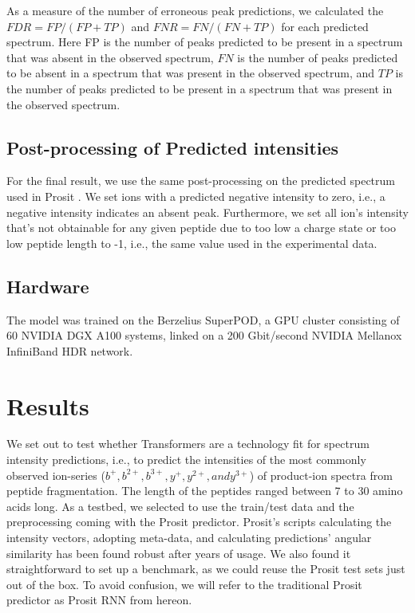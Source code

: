 \documentclass[10pt,a4paper]{article}
\begin{document}
As a measure of the number of erroneous peak predictions, we calculated the $FDR=FP/(FP+TP)$ and $FNR=FN/(FN+TP)$ for each predicted spectrum. Here FP is the number of peaks predicted to be present in a spectrum that was absent in the observed spectrum, $FN$ is the number of peaks predicted to be absent in a spectrum that was present in the observed spectrum, and $TP$ is the number of peaks predicted to be present in a spectrum that was present in the observed spectrum.   

\subsection*{Post-processing of Predicted intensities}
For the final result, we use the same post-processing on the predicted spectrum used in Prosit ​\cite{Gessulat2019-el}. We set ions with a predicted negative intensity to zero, i.e., a negative intensity indicates an absent peak. Furthermore, we set all ion's intensity that's not obtainable for any given peptide due to too low a charge state or too low peptide length to -1, i.e., the same value used in the experimental data. 

\subsection*{Hardware}

The model was trained on the Berzelius SuperPOD, a GPU cluster consisting of 60 NVIDIA DGX A100 systems, linked on a 200 Gbit/second NVIDIA Mellanox InfiniBand HDR network.

\section*{Results}
We set out to test whether Transformers are a technology fit for spectrum intensity predictions, i.e., to predict the intensities of the most commonly observed ion-series ($b^+, b^{2+}, b^{3+}, y^{+}, y^{2+}, and y^{3+}$) of product-ion spectra from peptide fragmentation. The length of the peptides ranged between 7 to 30  amino acids long. As a testbed, we selected to use the train/test data and the preprocessing coming with the Prosit predictor. Prosit’s scripts calculating the intensity vectors, adopting meta-data, and calculating predictions’ angular similarity has been found robust after years of usage. We also found it straightforward to set up a benchmark, as we could reuse the Prosit test sets just out of the box. To avoid confusion, we will refer to the traditional Prosit predictor as Prosit RNN from hereon.
\end{document}

